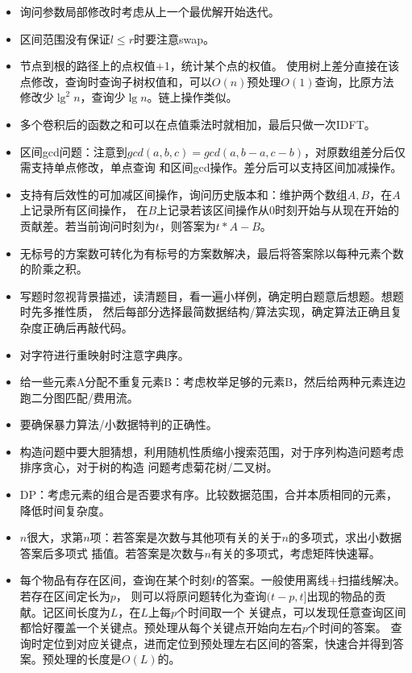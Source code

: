 \begin{itemize}
	\item 询问参数局部修改时考虑从上一个最优解开始迭代。
	\item 区间范围没有保证$l\leq r$时要注意swap。
	\item 节点到根的路径上的点权值+1，统计某个点的权值。
	使用树上差分直接在该点修改，查询时查询子树权值和，可以$O(n)$预处理$O(1)$查询，比原方法
	修改少$\lg^2 n$，查询少$\lg n$。链上操作类似。
	\item 多个卷积后的函数之和可以在点值乘法时就相加，最后只做一次IDFT。
	\item 区间gcd问题：注意到$gcd(a,b,c)=gcd(a,b-a,c-b)$，对原数组差分后仅需支持单点修改，单点查询
	和区间gcd操作。差分后可以支持区间加减操作。
	\item 支持有后效性的可加减区间操作，询问历史版本和：维护两个数组$A,B$，在$A$上记录所有区间操作，
	在$B$上记录若该区间操作从0时刻开始与从现在开始的贡献差。若当前询问时刻为$t$，则答案为$t*A-B$。
	\label{HistorySum}
	\item 无标号的方案数可转化为有标号的方案数解决，最后将答案除以每种元素个数的阶乘之积。
	\item 写题时忽视背景描述，读清题目，看一遍小样例，确定明白题意后想题。想题时先多推性质，
	然后每部分选择最简数据结构/算法实现，确定算法正确且复杂度正确后再敲代码。
	\item 对字符进行重映射时注意字典序。
	\item 给一些元素A分配不重复元素B：考虑枚举足够的元素B，然后给两种元素连边跑二分图匹配/费用流。
	\item 要确保暴力算法/小数据特判的正确性。
	\item 构造问题中要大胆猜想，利用随机性质缩小搜索范围，对于序列构造问题考虑排序贪心，对于树的构造
	问题考虑菊花树/二叉树。
	\item DP：考虑元素的组合是否要求有序。比较数据范围，合并本质相同的元素，降低时间复杂度。
	\item $n$很大，求第$n$项：若答案是次数与其他项有关的关于$n$的多项式，求出小数据答案后多项式
	插值。若答案是次数与$n$有关的多项式，考虑矩阵快速幂。
	\item 每个物品有存在区间，查询在某个时刻$t$的答案。一般使用离线+扫描线解决。若存在区间定长为$p$，
	则可以将原问题转化为查询$(t-p,t]$出现的物品的贡献。记区间长度为$L$，在$L$上每$p$个时间取一个
	关键点，可以发现任意查询区间都恰好覆盖一个关键点。预处理从每个关键点开始向左右$p$个时间的答案。
	查询时定位到对应关键点，进而定位到预处理左右区间的答案，快速合并得到答案。预处理的长度是$O(L)$的。

\end{itemize}
